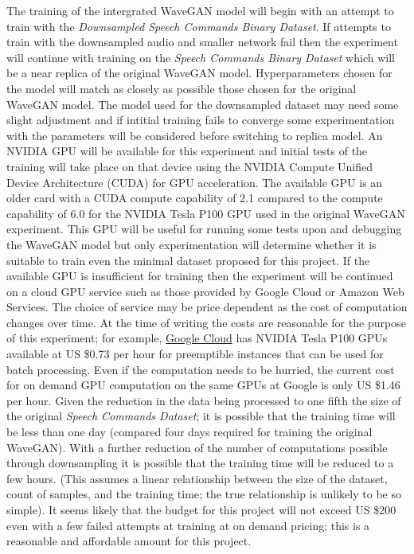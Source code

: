 \documentclass[a4paper, dvipsnames, titlepage]{article}
\begin{document}
The training of the intergrated WaveGAN model will begin with an attempt to train with the \textit{Downsampled Speech Commands Binary Dataset}.
If attempts to train with the downsampled audio and smaller network fail then the experiment will continue with training on the \textit{Speech Commands Binary Dataset} which will be a near replica of the original WaveGAN model.
\newline
\newline
Hyperparameters chosen for the model will match as closely as possible those chosen for the original WaveGAN model.
The model used for the downsampled dataset may need some slight adjustment and if intitial training fails to converge some experimentation with the parameters will be considered before switching to replica model.
\newline
\newline
An NVIDIA GPU will be available for this experiment and initial tests of the training will take place on that device using the NVIDIA Compute Unified Device Architecture (CUDA) for GPU acceleration.
The available GPU is an older card with a CUDA compute capability of 2.1 compared to the compute capability of 6.0 for the NVIDIA Tesla P100 GPU used in the original WaveGAN experiment.
This GPU will be useful for running some tests upon and debugging the WaveGAN model but only experimentation will determine whether it is suitable to train even the minimal dataset proposed for this project.
\newline
\newline
If the available GPU is insufficient for training then the experiment will be continued on a cloud GPU service such as those provided by Google Cloud or Amazon Web Services.
The choice of service may be price dependent as the cost of computation changes over time.
At the time of writing the costs are reasonable for the purpose of this experiment; for example, \href{https://cloud.google.com/gpu/}{Google Cloud} has NVIDIA Tesla P100 GPUs available at US \$0.73 per hour for preemptible instances that can be used for batch processing.
Even if the computation needs to be hurried, the current cost for on demand GPU computation on the same GPUs at Google is only US \$1.46 per hour.
\newline
\newline
Given the reduction in the data being processed to one fifth the size of the original \textit{Speech Commands Dataset}; it is possible that the training time will be less than one day (compared four days required for training the original WaveGAN).
With a further reduction of the number of computations possible through downsampling it is possible that the training time will be reduced to a few hours.
(This assumes a linear relationship between the size of the dataset, count of samples, and the training time; the true relationship is unlikely to be so simple).
It seems likely that the budget for this project will not exceed US \$200 even with a few failed attempts at training at on demand pricing; this is a reasonable and affordable amount for this project.
\end{document}
